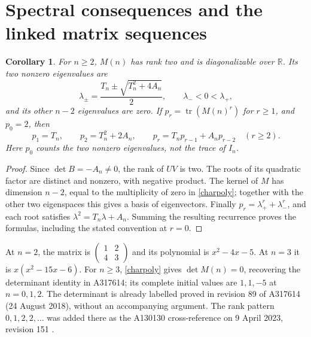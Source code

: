 \documentclass[11pt]{article}
\newtheorem{corollary}[theorem]{Corollary}
\newcommand{\tr}{\operatorname{tr}}
\begin{document}
\section{Spectral consequences and the linked matrix sequences}
\begin{corollary}\label{spectrum}
For $n\geq2$, $M(n)$ has rank two and is diagonalizable over $\mathbb R$.
Its two nonzero eigenvalues are
\[
 \lambda_{\pm}=\frac{T_n\pm\sqrt{T_n^2+4A_n}}2,
 \qquad \lambda_-<0<\lambda_+,
\]
and its other $n-2$ eigenvalues are zero. If $p_r=\tr(M(n)^r)$ for
$r\geq1$, and $p_0=2$, then
\[
 p_1=T_n,\qquad p_2=T_n^2+2A_n,\qquad
 p_r=T_np_{r-1}+A_np_{r-2}\quad(r\geq2).
\]
Here $p_0$ counts the two nonzero eigenvalues, not the trace of $I_n$.
\end{corollary}
\begin{proof}
Since $\det B=-A_n\ne0$, the rank of $UV$ is two. The roots of its
quadratic factor are distinct and nonzero, with negative product.
The kernel of $M$ has dimension $n-2$, equal to the multiplicity of zero
in \eqref{charpoly}; together with the other two eigenspaces this gives
a basis of eigenvectors. Finally $p_r=\lambda_+^r+\lambda_-^r$, and each
root satisfies $\lambda^2=T_n\lambda+A_n$. Summing the resulting
recurrence proves the formulas, including the stated convention at $r=0$.
\end{proof}
At $n=2$, the matrix is $\left(\begin{smallmatrix}1&2\\4&3\end{smallmatrix}\right)$
and its polynomial is $x^2-4x-5$. At $n=3$ it is $x(x^2-15x-6)$.
For $n\geq3$, \eqref{charpoly} gives $\det M(n)=0$, recovering the
determinant identity in A317614; its complete initial values are $1,1,-5$
at $n=0,1,2$. The determinant is already labelled proved in revision 89
of A317614 (24 August 2018), without an accompanying argument.
The rank pattern $0,1,2,2,\ldots$ was added there as the A130130
cross-reference on 9 April 2023, revision 151 \cite{matrix}.
\end{document}
